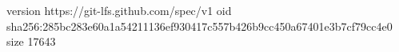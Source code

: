 version https://git-lfs.github.com/spec/v1
oid sha256:285bc283e60a1a54211136ef930417c557b426b9cc450a67401e3b7cf79cc4e0
size 17643
